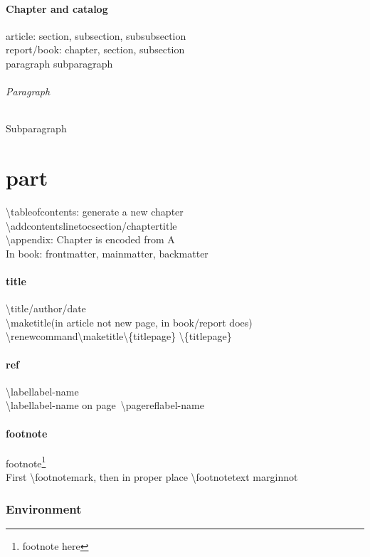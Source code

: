 \documentclass{article}
\begin{document}
\subsection{Chapter and catalog}
    article: section, subsection, subsubsection \\
    report/book: chapter, section, subsection \\
    paragraph subparagraph
    \paragraph{Paragraph}
    \subparagraph{Subparagraph}
    \part{part}
    \textbackslash tableofcontents: generate a new chapter \\
    \textbackslash addcontentsline{toc}{section/chapter}{title} \\
    \textbackslash appendix: Chapter is encoded from A \\
    In book: frontmatter, mainmatter, backmatter
\subsection{title}
    \textbackslash title/author/date \\
    \textbackslash maketitle(in article not new page, in book/report does) \\
    \textbackslash renewcommand{\textbackslash maketitle}{\textbackslash \{titlepage\} \textbackslash \{titlepage\}}
\subsection{ref}
    \textbackslash label{label-name}\\
    \textbackslash label{label-name} on page~\textbackslash pageref{label-name}
\subsection{footnote}
    footnote\footnote{footnote here}\\
    First \textbackslash footnotemark, then in proper place \textbackslash footnotetext
    marginnot 

\section{Environment}
\end{document}
